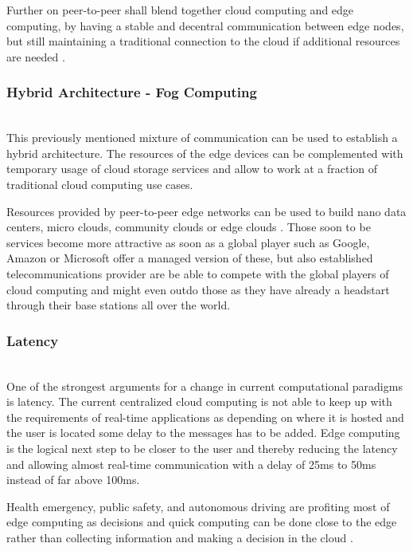 Further on peer-to-peer shall blend together cloud computing and edge computing, by having a stable and decentral communication between edge nodes, but still maintaining a traditional connection to the cloud if additional resources are needed \cite{GarciaLopez:2015:ECV:2831347.2831354}.

\subsubsection{Hybrid Architecture - Fog Computing}\hspace*{\fill} \\
This previously mentioned mixture of communication can be used to establish a hybrid architecture. The resources of the edge devices can be complemented with temporary usage of cloud storage services \cite{GarciaLopez:2015:ECV:2831347.2831354} and allow to work at a fraction of traditional cloud computing use cases.

Resources provided by peer-to-peer edge networks can be used to build nano data centers, micro clouds, community clouds or edge clouds \cite{GarciaLopez:2015:ECV:2831347.2831354}. Those soon to be services become more attractive as soon as a global player such as Google, Amazon or Microsoft offer a managed version of these, but also established telecommunications provider are be able to compete with the global players of cloud computing and might even outdo those as they have already a headstart through their base stations all over the world.

\subsubsection{Latency}\hspace*{\fill} \\
One of the strongest arguments for a change in current computational paradigms is latency. The current centralized cloud computing is not able to keep up with the requirements of real-time applications as depending on where it is hosted and the user is located some delay to the messages has to be added.
Edge computing is the logical next step to be closer to the user and thereby reducing the latency and allowing almost real-time communication with a delay of 25ms to 50ms instead of far above 100ms.

Health emergency, public safety, and autonomous driving are profiting most of edge computing as decisions and quick computing can be done close to the edge rather than collecting information and making a decision in the cloud \cite{7488250}.

